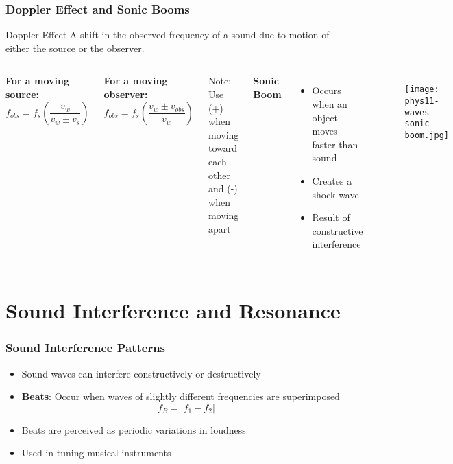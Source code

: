 \documentclass{beamer}
\begin{document}
\begin{frame}
\frametitle{Doppler Effect and Sonic Booms}
\begin{block}{Doppler Effect}
A shift in the observed frequency of a sound due to motion of either the source or the observer.
\end{block}

\begin{columns}
\textbf{For a moving source:}
\begin{equation}
f_{obs} = f_s\left(\frac{v_w}{v_w \pm v_s}\right)
\end{equation}

\textbf{For a moving observer:}
\begin{equation}
f_{obs} = f_s\left(\frac{v_w \pm v_{obs}}{v_w}\right)
\end{equation}

Note: Use (+) when moving toward each other and (-) when moving apart

\textbf{Sonic Boom}
\begin{itemize}
\item Occurs when an object moves faster than sound
\item Creates a shock wave
\item Result of constructive interference
\end{itemize}
\begin{figure}
    \centering
    \texttt{[image: phys11-waves-sonic-boom.jpg]}
\end{figure}
\end{columns}
\end{frame}

\section{Sound Interference and Resonance}

\begin{frame}
\frametitle{Sound Interference Patterns}
\begin{itemize}
\item Sound waves can interfere constructively or destructively
\item \textbf{Beats}: Occur when waves of slightly different frequencies are superimposed
\begin{equation}
f_B = |f_1 - f_2|
\end{equation}
\item Beats are perceived as periodic variations in loudness
\item Used in tuning musical instruments
\end{itemize}
\end{frame}
\end{document}
